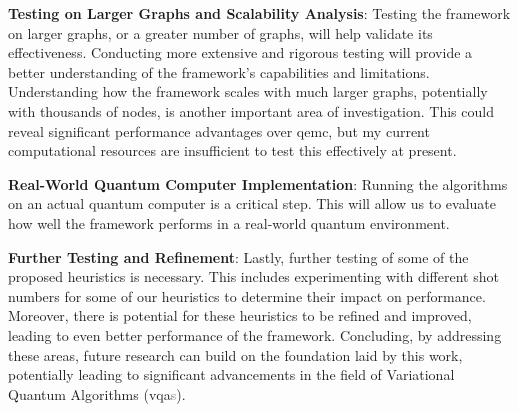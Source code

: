\noindent\textbf{Testing on Larger Graphs and Scalability Analysis}: Testing the framework on larger graphs, or a greater number of graphs, will help validate its effectiveness. Conducting more extensive and rigorous testing will provide a better understanding of the framework's capabilities and limitations. Understanding how the framework scales with much larger graphs, potentially with thousands of nodes, is another important area of investigation. This could reveal significant performance advantages over \acrshort{qemc}, but my current computational resources are insufficient to test this effectively at present.
\vspace{5mm}

\noindent\textbf{Real-World Quantum Computer Implementation}: Running the algorithms on an actual quantum computer is a critical step. This will allow us to evaluate how well the framework performs in a real-world quantum environment.
\vspace{5mm}

\noindent\textbf{Further Testing and Refinement}: Lastly, further testing of some of the proposed heuristics is necessary. This includes experimenting with different shot numbers for some of our heuristics to determine their impact on performance. Moreover, there is potential for these heuristics to be refined and improved, leading to even better performance of the framework. Concluding, by addressing these areas, future research can build on the foundation laid by this work, potentially leading to significant advancements in the field of Variational Quantum Algorithms (\acrshort{vqa}\textcolor{gray}{s}).


